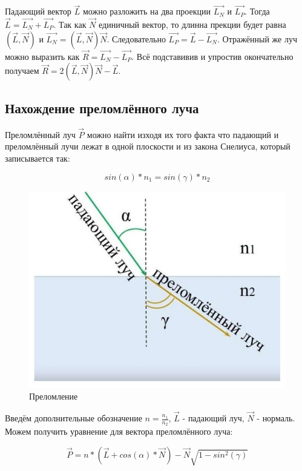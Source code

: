 \documentclass[12pt,a4paper,oneside]{report}
\begin{document}
				\quad Падающий вектор $\vec{L}$ можно разложить на два проекции $\vec{L_{N}}$ и $\vec{L_{P}}$. Тогда $\vec{L} = \vec{L_{N}} + \vec{L_{P}}$. Так как $\vec{N}$ единичный вектор, то длинна прекции будет равна $(\vec{L}, \vec{N})$ и $\vec{L_{N}} = (\vec{L}, \vec{N})\vec{N}$. Следовательно $\vec{L_{P}} = \vec{L} - \vec{L_{N}}$. Отражённый же луч можно выразить как $\vec{R} = \vec{L_{N}} - \vec{L_{P}}$. Всё подставивив и упростив окончательно получаем $\vec{R} = 2(\vec{L}, \vec{N})\vec{N} - \vec{L}$.
			\subsection{Нахождение преломлённого луча}
				\quad Преломлённый луч $\vec{P}$ можно найти изходя их того факта что падающий и преломлённый лучи лежат в одной плоскости и из закона Снелиуса, который записывается так:
				
				\[
    				sin(\alpha)*n_{1} = sin(\gamma)*n_{2}
					\label{eq:9}
				\] 
				
				\begin{figure}[htp]
					\centering
					\includegraphics[scale=0.2]{refract}
					\caption{Преломление}
					\label{fig:refract}
				\end{figure}
				
				\quad Введём дополнительные обозначение $n = \frac{n_{1}}{n_{2}}$, $\vec{L}$ - падающий луч, $\vec{N}$ - нормаль. Можем получить уравнение для вектора преломлённого луча:
				
				\[
    				\vec{P} = n*(\vec{L} + cos(\alpha)*\vec{N}) - \vec{N}\sqrt{1 - sin^2(\gamma)}
				\]
				
\end{document}
